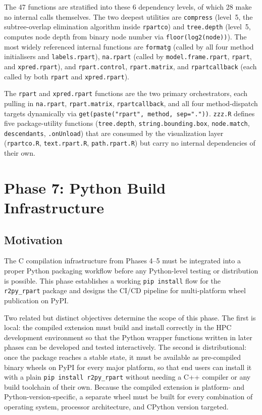 \documentclass[12pt]{article}
\begin{document}
The 47 functions are stratified into these 6 dependency levels, of which 28 make no internal calls themselves. The two deepest utilities are \texttt{compress} (level~5, the subtree-overlap elimination algorithm inside \texttt{rpartco}) and \texttt{tree.depth} (level~5, computes node depth from binary node number via \texttt{floor(log2(node))}). The most widely referenced internal functions are \texttt{formatg} (called by all four method initialisers and \texttt{labels.rpart}), \texttt{na.rpart} (called by \texttt{model.frame.rpart}, \texttt{rpart}, and \texttt{xpred.rpart}), and \texttt{rpart.control}, \texttt{rpart.matrix}, and \texttt{rpartcallback} (each called by both \texttt{rpart} and \texttt{xpred.rpart}).

The \texttt{rpart} and \texttt{xpred.rpart} functions are the two primary orchestrators, each pulling in \texttt{na.rpart}, \texttt{rpart.matrix}, \texttt{rpartcallback}, and all four method-dispatch targets dynamically via \texttt{get(paste("rpart", method, sep="."))}. \texttt{zzz.R} defines five package-utility functions (\texttt{tree.depth}, \texttt{string.bounding.box}, \texttt{node.match}, \texttt{descendants}, \texttt{.onUnload}) that are consumed by the visualization layer (\texttt{rpartco.R}, \texttt{text.rpart.R}, \texttt{path.rpart.R}) but carry no internal dependencies of their own.

\section{Phase 7: Python Build Infrastructure}
\label{sec:phase7}

\subsection{Motivation}

The C compilation infrastructure from Phases 4--5 must be integrated into a proper Python packaging workflow before any Python-level testing or distribution is possible. This phase establishes a working \texttt{pip install} flow for the \texttt{r2py\_rpart} package and designs the CI/CD pipeline for multi-platform wheel publication on PyPI.

Two related but distinct objectives determine the scope of this phase. The first is local: the compiled extension must build and install correctly in the HPC development environment so that the Python wrapper functions written in later phases can be developed and tested interactively. The second is distributional: once the package reaches a stable state, it must be available as pre-compiled binary wheels on PyPI for every major platform, so that end users can install it with a plain \texttt{pip install r2py\_rpart} without needing a C++ compiler or any build toolchain of their own. Because the compiled extension is platform- and Python-version-specific, a separate wheel must be built for every combination of operating system, processor architecture, and CPython version targeted.
\end{document}
